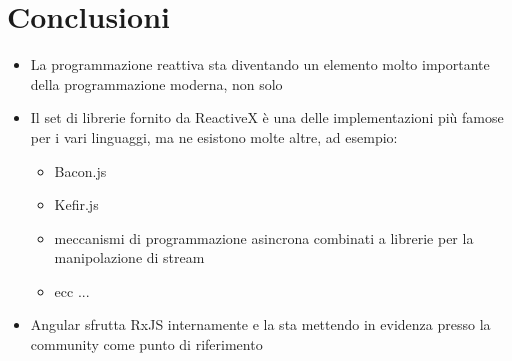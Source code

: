     \section{Conclusioni}\label{sec:conclusioni}
    \begin{frame}
        \begin{block}{\insertsectionhead}%
            \begin{itemize}
              \item
                  La programmazione reattiva sta diventando un elemento molto importante della programmazione moderna, non solo 
              \item
                  Il set di librerie fornito da ReactiveX è una delle implementazioni più famose per i vari linguaggi, ma ne esistono molte altre, ad esempio:
                  \begin{itemize}
                      \item Bacon.js
                      \item Kefir.js
                      \item meccanismi di programmazione asincrona combinati a librerie per la manipolazione di stream
                      \item ecc ...
                  \end{itemize}
              \item Angular sfrutta RxJS internamente e la sta mettendo in evidenza presso la community come punto di riferimento
            \end{itemize}
        \end{block}
    \end{frame}

    \nocite{*}
    \section{\refname}\label{sec:ref}
    \begin{frame}[c,allowframebreaks]{\insertsectionhead}
        \printbibliography
    \end{frame}

